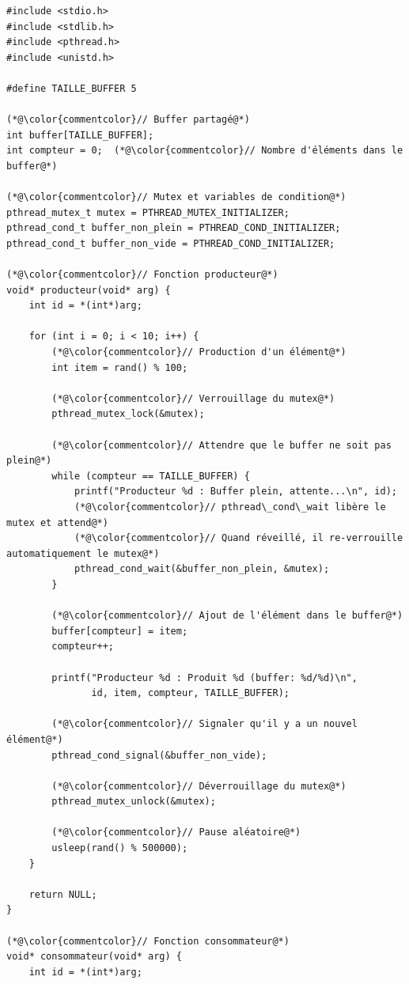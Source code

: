 \documentclass[11pt,a4paper]{article}
\begin{document}
\begin{lstlisting}[caption={Problème classique producteur-consommateur}]
#include <stdio.h>
#include <stdlib.h>
#include <pthread.h>
#include <unistd.h>

#define TAILLE_BUFFER 5

(*@\color{commentcolor}// Buffer partagé@*)
int buffer[TAILLE_BUFFER];
int compteur = 0;  (*@\color{commentcolor}// Nombre d'éléments dans le buffer@*)

(*@\color{commentcolor}// Mutex et variables de condition@*)
pthread_mutex_t mutex = PTHREAD_MUTEX_INITIALIZER;
pthread_cond_t buffer_non_plein = PTHREAD_COND_INITIALIZER;
pthread_cond_t buffer_non_vide = PTHREAD_COND_INITIALIZER;

(*@\color{commentcolor}// Fonction producteur@*)
void* producteur(void* arg) {
    int id = *(int*)arg;
    
    for (int i = 0; i < 10; i++) {
        (*@\color{commentcolor}// Production d'un élément@*)
        int item = rand() % 100;
        
        (*@\color{commentcolor}// Verrouillage du mutex@*)
        pthread_mutex_lock(&mutex);
        
        (*@\color{commentcolor}// Attendre que le buffer ne soit pas plein@*)
        while (compteur == TAILLE_BUFFER) {
            printf("Producteur %d : Buffer plein, attente...\n", id);
            (*@\color{commentcolor}// pthread\_cond\_wait libère le mutex et attend@*)
            (*@\color{commentcolor}// Quand réveillé, il re-verrouille automatiquement le mutex@*)
            pthread_cond_wait(&buffer_non_plein, &mutex);
        }
        
        (*@\color{commentcolor}// Ajout de l'élément dans le buffer@*)
        buffer[compteur] = item;
        compteur++;
        
        printf("Producteur %d : Produit %d (buffer: %d/%d)\n",
               id, item, compteur, TAILLE_BUFFER);
        
        (*@\color{commentcolor}// Signaler qu'il y a un nouvel élément@*)
        pthread_cond_signal(&buffer_non_vide);
        
        (*@\color{commentcolor}// Déverrouillage du mutex@*)
        pthread_mutex_unlock(&mutex);
        
        (*@\color{commentcolor}// Pause aléatoire@*)
        usleep(rand() % 500000);
    }
    
    return NULL;
}

(*@\color{commentcolor}// Fonction consommateur@*)
void* consommateur(void* arg) {
    int id = *(int*)arg;
    

\end{lstlisting}
\end{document}
